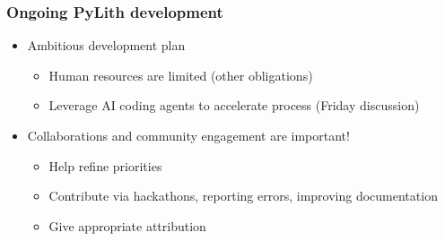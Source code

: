 \documentclass[aspectratio=169]{beamer}
\begin{document}
\begin{frame}
  \frametitle{Ongoing PyLith development}

  \begin{itemize}
  \item Ambitious development plan
    \begin{itemize}
    \item Human resources are limited (other obligations)
    \item Leverage AI coding agents to accelerate process (Friday discussion)
    \end{itemize}
  \item Collaborations and community engagement are important!
    \begin{itemize}
    \item Help refine priorities
    \item Contribute via hackathons, reporting errors, improving documentation
    \item Give appropriate attribution
    \end{itemize}
  \end{itemize}

\end{frame}


\end{document}

